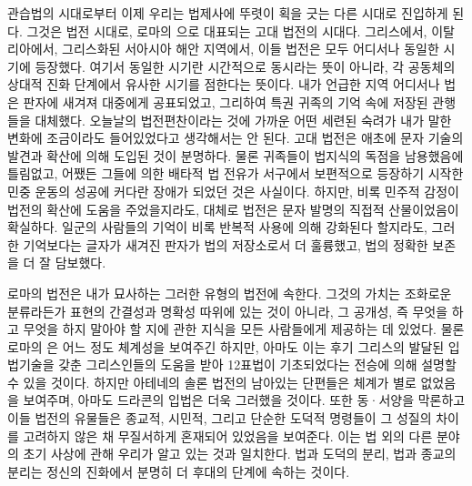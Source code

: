 관습법의 시대로부터 이제 우리는 법제사에 뚜렷이 획을 긋는 다른
시대로 진입하게 된다.
그것은 법전 시대로,
로마의 으로 대표되는 고대 법전의 시대다.
그리스에서, 이탈리아에서, 그리스화된 서아시아 해안 지역에서,
이들 법전은 모두 어디서나 동일한 시기에 등장했다.
여기서 동일한 시기란
시간적으로 동시라는 뜻이 아니라,
각 공동체의 상대적 진화 단계에서 유사한 시기를 점한다는 뜻이다.
내가 언급한 지역 어디서나 법은 판자에 새겨져 대중에게 공표되었고,
그리하여 특권 귀족의 기억 속에 저장된 관행들을 대체했다.
오늘날의 법전편찬이라는 것에 가까운 어떤 세련된 숙려가
내가 말한 변화에 조금이라도 들어있었다고 생각해서는 안 된다.
고대 법전은 애초에 문자 기술의 발견과 확산에 의해 도입된 것이 분명하다.
물론 귀족들이 법지식의 독점을 남용했음에 틀림없고,
어쨌든 그들에 의한 배타적 법 전유가 서구에서 보편적으로 등장하기 시작한
민중 운동의 성공에 커다란 장애가 되었던 것은 사실이다.
하지만, 비록 민주적 감정이 법전의 확산에 도움을 주었을지라도,
대체로 법전은 문자 발명의 직접적 산물이었음이 확실하다.
일군의 사람들의 기억이
비록 반복적 사용에 의해 강화된다 할지라도,
그러한 기억보다는
글자가 새겨진 판자가 법의 저장소로서 더 훌륭했고,
법의 정확한 보존을 더 잘 담보했다.

로마의 법전은 내가 묘사하는 그러한 유형의 법전에 속한다.
그것의 가치는 조화로운 분류라든가 표현의 간결성과 명확성 따위에
있는 것이 아니라, 그 공개성, 즉 무엇을 하고 무엇을 하지 말아야 할 지에 관한
지식을 모든 사람들에게 제공하는 데 있었다.
물론 로마의 은 어느 정도 체계성을 보여주긴 하지만,
아마도 이는 후기 그리스의 발달된 입법기술을 갖춘 그리스인들의 도움을 받아
12표법이 기초되었다는 전승에 의해 설명할 수 있을 것이다.
하지만 아테네의 솔론 법전의 남아있는 단편들은
체계가 별로 없었음을 보여주며, 아마도 드라콘의 입법은 더욱 그러했을 것이다.
또한 동^^b7서양을 막론하고 이들 법전의 유물들은
종교적, 시민적, 그리고 단순한 도덕적 명령들이
그 성질의 차이를 고려하지 않은 채 무질서하게 혼재되어 있었음을 보여준다.
이는 법 외의 다른 분야의 초기 사상에 관해 우리가 알고 있는 것과 일치한다.
법과 도덕의 분리, 법과 종교의 분리는 정신의 진화에서
분명히 더 후대의 단계에 속하는 것이다.

